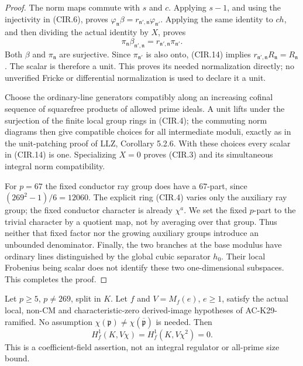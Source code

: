 \begin{proof}
The norm maps commute with \(s\) and \(c\).  Applying
\(s-1\), and using the injectivity in (CIR.6), proves
\(\varphi_{\mathfrak n}\beta
 =r_{\mathfrak n',\mathfrak n}\varphi_{\mathfrak n'}\).
Applying the same identity to \(ch\), and then dividing the
actual identity by \(X\), proves
\[
 \pi_{\mathfrak n}\beta_{\mathfrak n',\mathfrak n}
       =r_{\mathfrak n',\mathfrak n}\pi_{\mathfrak n'}.
                                                               \tag{CIR.14}
\]
Both \(\beta\) and \(\pi_{\mathfrak n}\) are surjective.
Since \(\pi_{\mathfrak n'}\) is also onto, (CIR.14) implies
\(r_{\mathfrak n',\mathfrak n}R_{\mathfrak n}=R_{\mathfrak n}\).
The scalar is therefore a unit.  This proves its needed
normalization directly; no unverified Fricke or differential
normalization is used to declare it a unit.

Choose the ordinary-line generators compatibly along an
increasing cofinal sequence of squarefree products of allowed
prime ideals.  A unit lifts under the surjection of the finite
local group rings in (CIR.4); the commuting norm diagrams then
give compatible choices for all intermediate moduli, exactly
as in the unit-patching proof of LLZ, Corollary 5.2.6.
With these choices every scalar in (CIR.14) is one.  Specializing
\(X=0\) proves (CIR.3) and its simultaneous integral norm
compatibility.

For \(p=67\) the fixed conductor ray group does have a
\(67\)-part, since \((269^2-1)/6=12060\).  The explicit ring
(CIR.4) varies only the auxiliary ray group; the fixed conductor
character is already \(\chi^a\).  We set the fixed \(p\)-part
to the trivial character by a quotient map, not by averaging
over that group.  Thus neither that fixed factor nor the
growing auxiliary groups introduce an unbounded denominator.
Finally, the two branches at the base modulus have ordinary
lines distinguished by the global cubic separator \(h_0\).
Their local Frobenius being scalar does not identify these
two one-dimensional subspaces.  This completes the proof.
\end{proof}

\begin{theorem}
\label{AC-K29-irregular}
Let \(p\geq5\), \(p\neq269\), split in \(K\).  Let \(f\)
and \(V=M_f(e)\), \(e\geq1\), satisfy the actual local,
non-CM and characteristic-zero derived-image hypotheses of
AC-K29-ramified.  No assumption
\(\chi(\mathfrak p)\neq\chi(\overline{\mathfrak p})\) is needed.
Then
\[
                 H_f^1(K,V\chi)=H_f^1(K,V\chi^2)=0.    \tag{CIR.15}
\]
This is a coefficient-field assertion, not an integral
regulator or all-prime size bound.
\end{theorem}

